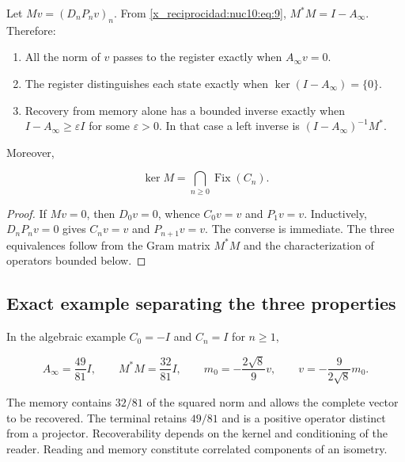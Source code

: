 Let \(Mv=(D_nP_nv)_n\). From \eqref{x_reciprocidad:nuc10:eq:9}, \(M^*M=I-A_\infty\). Therefore:

\begin{enumerate}
\item All the norm of \(v\) passes to the register exactly when \(A_\infty v=0\).
\item The register distinguishes each state exactly when \(\ker(I-A_\infty)=\{0\}\).
\item Recovery from memory alone has a bounded inverse exactly when
\(I-A_\infty\geq\varepsilon I\) for some \(\varepsilon>0\).
In that case a left inverse is \((I-A_\infty)^{-1}M^*\).
\end{enumerate}

Moreover,



\begin{equation}
\boxed{\ker M=\bigcap_{n\ge0}\operatorname{Fix}(C_n).}
\label{x_reciprocidad:nuc10:eq:12}
\end{equation}



\begin{proof}
If \(Mv=0\), then \(D_0v=0\), whence \(C_0v=v\)
and \(P_1v=v\). Inductively, \(D_nP_nv=0\) gives \(C_nv=v\) and
\(P_{n+1}v=v\). The converse is immediate. The three equivalences
follow from the Gram matrix \(M^*M\) and the characterization of operators
bounded below.
\end{proof}

\subsection{Exact example separating the three properties}

In the algebraic example \(C_0=-I\) and \(C_n=I\) for \(n\geq1\),



\begin{equation}
A_\infty=\frac{49}{81}I,\qquad M^*M=\frac{32}{81}I,
\qquad m_0=-\frac{2\sqrt8}{9}v,
\qquad v=-\frac9{2\sqrt8}m_0.
\label{x_reciprocidad:nuc10:eq:13}
\end{equation}



The memory contains \(32/81\) of the squared norm and allows the complete vector to be recovered. The terminal retains \(49/81\) and is a positive operator distinct from a projector. Recoverability depends on the kernel and conditioning of the reader. Reading and memory constitute correlated components of an isometry.

